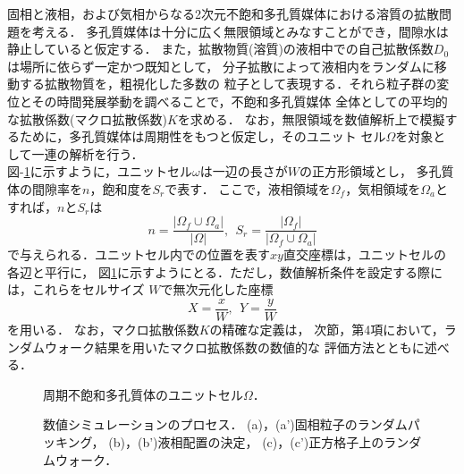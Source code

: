 ﻿%
固相と液相，および気相からなる2次元不飽和多孔質媒体における溶質の拡散問題を考える．
多孔質媒体は十分に広く無限領域とみなすことができ，間隙水は静止していると仮定する．
また，拡散物質(溶質)の液相中での自己拡散係数$D_0$は場所に依らず一定かつ既知として，
分子拡散によって液相内をランダムに移動する拡散物質を，粗視化した多数の
粒子として表現する．それら粒子群の変位とその時間発展挙動を調べることで，不飽和多孔質媒体
全体としての平均的な拡散係数(マクロ拡散係数)$K$を求める．
なお，無限領域を数値解析上で模擬するために，多孔質媒体は周期性をもつと仮定し，そのユニット
セル$\Omega$を対象として一連の解析を行う．\\
\hspace{\parindent}
図-\ref{fig:fig0}に示すように，ユニットセル$\omega$は一辺の長さが$W$の正方形領域とし，
多孔質体の間隙率を$n$，飽和度を$S_r$で表す．
ここで，液相領域を$\Omega_f$，気相領域を$\Omega_a$とすれば，$n$と$S_r$は
\begin{equation}
	n=\frac{\left|\Omega_f\cup\Omega_a\right|}{\left| \Omega \right|}, \ \ 
	S_r=\frac{\left|\Omega_f\right|}{\left|\Omega_f\cup\Omega_a\right|}
	\label{eqn:def_n_Sr}
\end{equation}
で与えられる．ユニットセル内での位置を表す$xy$直交座標は，ユニットセルの各辺と平行に，
図\ref{fig:fig0}に示すようにとる．ただし，数値解析条件を設定する際には，これらをセルサイズ
$W$で無次元化した座標
\begin{equation}
	X=\frac{x}{W}, \ \
	Y=\frac{y}{W}
	\label{eqn:XYcod}
\end{equation}
を用いる．
なお，マクロ拡散係数$K$の精確な定義は，
次節，第4項において，ランダムウォーク結果を用いたマクロ拡散係数の数値的な
評価方法とともに述べる．
\begin{figure}[t]
\begin{center}
\caption{
	周期不飽和多孔質体のユニットセル$\Omega$．
}
\label{fig:fig0}
\end{center}
\end{figure}
\begin{figure}[t]
\begin{center}
\caption{
数値シミュレーションのプロセス．
	(a)，(a')固相粒子のランダムパッキング，
	(b)，(b')液相配置の決定，
	(c)，(c')正方格子上のランダムウォーク．
}
\label{fig:fig1}
\end{center}
\end{figure}

